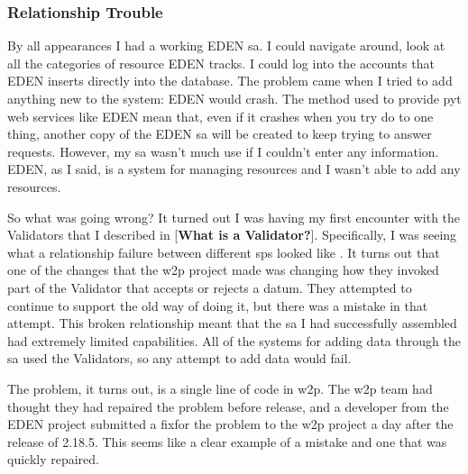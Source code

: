 \documentclass[a4paper,man,natbib,floatsintext]{apa6}
\begin{document}
  \subsubsection{Relationship Trouble}
  By all appearances I had a working \gls{EDEN} \gls{sa}. I could navigate around, look at all the categories of resource \gls{EDEN} tracks. I could log into the accounts that \gls{EDEN} inserts directly into the database. The problem came when I tried to add anything new to the system: \gls{EDEN} would crash. The method used to provide \Gls{pyt} web services like \gls{EDEN} mean that, even if it crashes when you try do to one thing, another copy of the \gls{EDEN} \gls{sa} will be created to keep trying to answer requests. However, my \gls{sa} wasn't much use if I couldn't enter any information. \gls{EDEN}, as I said, is a system for managing resources and I wasn't able to add any resources.

  So what was going wrong? It turned out I was having my first encounter with the Validators that I described in [\textbf{What is a Validator?}]. Specifically, I was seeing what a relationship failure between different \glspl{sp} looked like \citep{Mackenzie2006-hb}. It turns out that one of the changes that the \gls{w2p} project made was changing how they invoked part of the Validator that accepts or rejects a datum. They attempted to continue to support the old way of doing it, but there was a mistake in that attempt. This broken relationship meant that the \gls{sa} I had successfully assembled had extremely limited capabilities. All of the systems for adding data through the \gls{sa} used the Validators, so any attempt to add data would fail\footnotemark.


  The problem, it turns out, is a single line of code in \gls{w2p}. The \gls{w2p} team had thought they had repaired the problem before release, and a developer from the \gls{EDEN} project submitted a fix\footnotemark for the problem to the \gls{w2p} project a day after the release of 2.18.5. This seems like a clear example of a mistake and one that was quickly repaired. 

\end{document}
